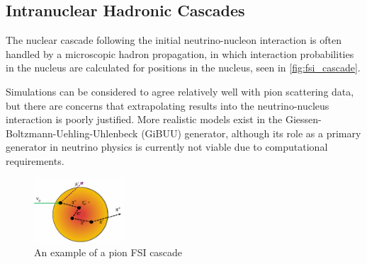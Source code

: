 \subsection{Intranuclear Hadronic Cascades}
The nuclear cascade following the initial neutrino-nucleon interaction is often handled by a microscopic hadron propagation, in which interaction probabilities in the nucleus are calculated for positions in the nucleus, seen in \autoref{fig:fsi_cascade}. 

Simulations can be considered to agree relatively well with pion scattering data\cite{thesis_elder}, but there are concerns that extrapolating results into the neutrino-nucleus interaction is poorly justified\cite{ulrich_review}. More realistic models exist in the Giessen-Boltzmann-Uehling-Uhlenbeck (GiBUU)\cite{gibuu} generator, although its role as a primary generator in neutrino physics is currently not viable due to computational requirements.
\begin{figure}[h]
	\centering
	\includegraphics[width=0.3\textwidth, trim={0mm 0mm 0mm 0mm}, clip,page=1]{figures/niwg/diagrams/cascade}
	\caption{An example of a pion FSI cascade}
	\label{fig:fsi_cascade}
\end{figure}

